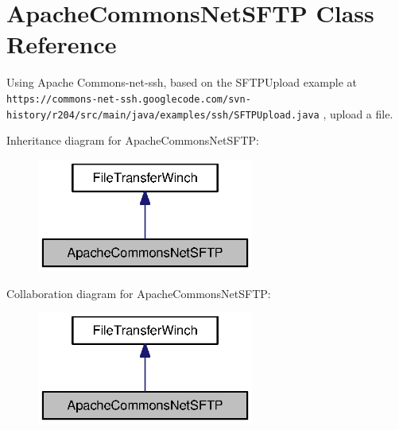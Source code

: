 \section{Apache\-Commons\-Net\-S\-F\-T\-P Class Reference}
\label{classorg_1_1smallfoot_1_1filexfer_1_1ApacheCommonsNetSFTP}


Using Apache Commons-\/net-\/ssh, based on the S\-F\-T\-P\-Upload example at {\tt https\-://commons-\/net-\/ssh.\-googlecode.\-com/svn-\/history/r204/src/main/java/examples/ssh/\-S\-F\-T\-P\-Upload.\-java} , upload a file.  




Inheritance diagram for Apache\-Commons\-Net\-S\-F\-T\-P\-:\nopagebreak
\begin{figure}[H]
\begin{center}
\leavevmode
\includegraphics[width=202pt]{classorg_1_1smallfoot_1_1filexfer_1_1ApacheCommonsNetSFTP__inherit__graph}
\end{center}
\end{figure}


Collaboration diagram for Apache\-Commons\-Net\-S\-F\-T\-P\-:\nopagebreak
\begin{figure}[H]
\begin{center}
\leavevmode
\includegraphics[width=202pt]{classorg_1_1smallfoot_1_1filexfer_1_1ApacheCommonsNetSFTP__coll__graph}
\end{center}
\end{figure}
